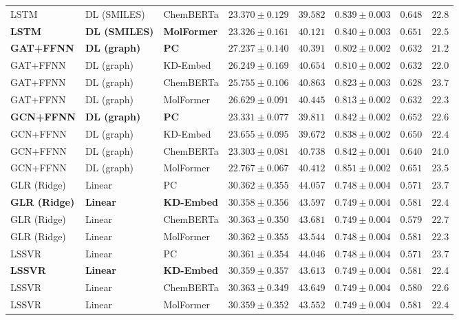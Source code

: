 \documentclass{article}
\begin{document}
\begin{table}[!ht]
{\begin{tabular}{lllccccr}
LSTM & DL (SMILES) & ChemBERTa & $23.370 \pm 0.129$ & $39.582$ & $0.839 \pm 0.003$ & $0.648$ & $22.8$ \\
\textbf{LSTM} & \textbf{DL (SMILES)} & \textbf{MolFormer} & $\mathbf{23.326 \pm 0.161}$ & $\mathbf{40.121}$ & $\mathbf{0.840 \pm 0.003}$ & $\mathbf{0.651}$ & $\mathbf{22.5}$ \\
\midrule
\textbf{GAT+FFNN} & \textbf{DL (graph)} & \textbf{PC} & $\mathbf{27.237 \pm 0.140}$ & $\mathbf{40.391}$ & $\mathbf{0.802 \pm 0.002}$ & $\mathbf{0.632}$ & $\mathbf{21.2}$ \\
GAT+FFNN & DL (graph) & KD-Embed & $26.249 \pm 0.169$ & $40.654$ & $0.810 \pm 0.002$ & $0.632$ & $22.0$ \\
GAT+FFNN & DL (graph) & ChemBERTa & $25.755 \pm 0.106$ & $40.863$ & $0.823 \pm 0.003$ & $0.628$ & $23.7$ \\
GAT+FFNN & DL (graph) & MolFormer & $26.629 \pm 0.091$ & $40.445$ & $0.813 \pm 0.002$ & $0.632$ & $22.3$ \\
\textbf{GCN+FFNN} & \textbf{DL (graph)} & \textbf{PC} & $\mathbf{23.331 \pm 0.077}$ & $\mathbf{39.811}$ & $\mathbf{0.842 \pm 0.002}$ & $\mathbf{0.652}$ & $\mathbf{22.6}$ \\
GCN+FFNN & DL (graph) & KD-Embed & $23.655 \pm 0.095$ & $39.672$ & $0.838 \pm 0.002$ & $0.650$ & $22.4$ \\
GCN+FFNN & DL (graph) & ChemBERTa & $23.303 \pm 0.081$ & $40.738$ & $0.842 \pm 0.001$ & $0.640$ & $24.0$ \\
GCN+FFNN & DL (graph) & MolFormer & $22.767 \pm 0.067$ & $40.412$ & $0.851 \pm 0.002$ & $0.651$ & $23.5$ \\
\midrule
GLR (Ridge) & Linear & PC & $30.362 \pm 0.355$ & $44.057$ & $0.748 \pm 0.004$ & $0.571$ & $23.7$ \\
\textbf{GLR (Ridge)} & \textbf{Linear} & \textbf{KD-Embed} & $\mathbf{30.358 \pm 0.356}$ & $\mathbf{43.597}$ & $\mathbf{0.749 \pm 0.004}$ & $\mathbf{0.581}$ & $\mathbf{22.4}$ \\
GLR (Ridge) & Linear & ChemBERTa & $30.363 \pm 0.350$ & $43.681$ & $0.749 \pm 0.004$ & $0.579$ & $22.7$ \\
GLR (Ridge) & Linear & MolFormer & $30.362 \pm 0.355$ & $43.544$ & $0.748 \pm 0.004$ & $0.581$ & $22.3$ \\
LSSVR & Linear & PC & $30.361 \pm 0.354$ & $44.046$ & $0.748 \pm 0.004$ & $0.571$ & $23.7$ \\
\textbf{LSSVR} & \textbf{Linear} & \textbf{KD-Embed} & $\mathbf{30.359 \pm 0.357}$ & $\mathbf{43.613}$ & $\mathbf{0.749 \pm 0.004}$ & $\mathbf{0.581}$ & $\mathbf{22.4}$ \\
LSSVR & Linear & ChemBERTa & $30.363 \pm 0.349$ & $43.649$ & $0.749 \pm 0.004$ & $0.580$ & $22.6$ \\
LSSVR & Linear & MolFormer & $30.359 \pm 0.352$ & $43.552$ & $0.749 \pm 0.004$ & $0.581$ & $22.4$ \\
\bottomrule
\end{tabular}
}
\end{table}
\end{document}
